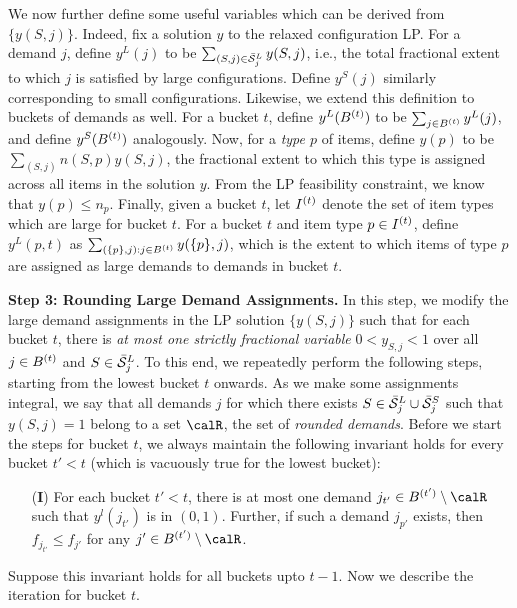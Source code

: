 We now further define some useful variables which can be derived from $\{y(S,j)\}$. Indeed, fix a solution $y$ to the relaxed configuration LP. For a demand $j$, define $y^L(j)$ to be $\sum_{(S,j) \in \bar{\cal S}^L_j} y(S,j)$, i.e., the total fractional extent to which $j$ is satisfied by large configurations. Define $y^S(j)$ similarly corresponding to small configurations. Likewise, we extend this definition to buckets of demands as well. For a bucket $t$, define $y^L(B^{(t)})$ to be $\sum_{j \in B^{(t)}} y^L(j)$, and define $y^S(B^{(t)})$ analogously. Now, for a \emph{type $p$} of items, define $y(p)$ to be $\sum_{(S,j)} n(S,p) y(S,j)$, the fractional extent to which this type is assigned across all items in the solution $y$. From the LP feasibility constraint, we know that $y(p) \leq n_p$. Finally, given a bucket $t$, let $I^{(t)}$ denote the set of item types which are large for bucket $t$. For a bucket $t$ and item type $p \in I^{(t)}$, define $y^L(p,t)$ as $\sum_{(\{p\}, j): j \in B^{(t)}} y(\{p\}, j)$, which is the extent to which items of type $p$ are assigned as large demands to demands in bucket $t$.

\medskip \noindent
{\bf Step 3: Rounding Large Demand Assignments.} In this step, we modify the large demand assignments in the LP solution $\{y(S,j)\}$ such that for each bucket $t$, there is \emph{at most one strictly fractional variable} $0 < y_{S,j} < 1$ over all $j \in B^{(t)}$ and $S \in \bar{\cal S}^L_j$. To this end, we repeatedly perform the following steps, starting from the lowest bucket $t$ onwards. As we make some assignments integral, we say that all demands $j$ for which there exists $S \in \bar{\cal S}^L_j \cup \bar{\cal S}^S_j$ such that $y(S,j)=1$ belong to a set $\calR$, the set of \emph{rounded demands}. Before we start the steps for bucket $t$, we always maintain the following invariant holds for every bucket $t' < t$ (which is vacuously true for the lowest bucket):
\begin{framed}
\begin{itemize}
\item[({\bf I})] For each bucket $t' < t$, there is at most one  demand $j_{t'} \in B^{(t')} \setminus \calR$ such that $y^l(j_{t'})$ is in $(0,1)$. Further, if such a demand $j_{p'}$ exists, then $f_{j_{t'}} \leq f_{j'}$ for any $j' \in B^{(t')} \setminus \calR$.
\end{itemize}
\end{framed}

Suppose this invariant holds for all buckets upto $t-1$. Now we describe the iteration for bucket $t$. 

